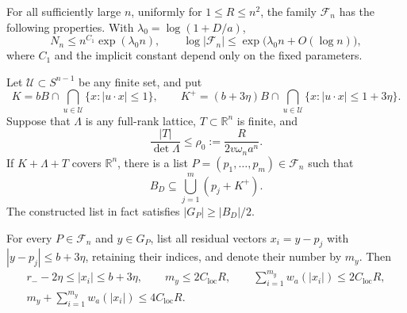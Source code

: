 \begin{proposition}\label{prop:localization}
For all sufficiently large $n$, uniformly for $1\le R\le n^2$, the family
$\mathcal F_n$ has the following properties.  With
$\lambda_0=\log(1+D/a)$,
\begin{equation}\label{eq:pattern-entropy}
 N_n\le n^{C_1}\exp(\lambda_0n),\qquad
 \log|\mathcal F_n|
       \le\exp\bigl(\lambda_0n+O(\log n)\bigr),
\end{equation}
where $C_1$ and the implicit constant depend only on the fixed parameters.

Let $\mathcal U\subset S^{n-1}$ be any finite set, and put
\[
 K=bB\cap\bigcap_{u\in\mathcal U}\{x:|u\cdot x|\le1\},\qquad
 K^+=(b+3\eta)B\cap
          \bigcap_{u\in\mathcal U}\{x:|u\cdot x|\le1+3\eta\}.
\]
Suppose that $\Lambda$ is any full-rank lattice, $T\subset\mathbb R^n$
is finite, and
\[
 \frac{|T|}{\det\Lambda}\le
       \rho_0:=\frac{R}{2v\omega_na^n}.
\]
If $K+\Lambda+T$ covers $\mathbb R^n$, there is a list
$P=(p_1,\ldots,p_m)\in\mathcal F_n$
such that
\begin{equation}\label{eq:localized-cover}
 B_D\subseteq\bigcup_{j=1}^{m}(p_j+K^+).
\end{equation}
The constructed list in fact satisfies $|G_P|\ge|B_D|/2$.

For every $P\in\mathcal F_n$ and $y\in G_P$, list all residual vectors
$x_i=y-p_j$ with $|y-p_j|\le b+3\eta$, retaining their indices, and denote
their number by $m_y$.  Then
\begin{equation}\label{eq:local-residual-budget}
 \begin{gathered}
 r_--2\eta\le |x_i|\le b+3\eta,\qquad
 m_y\le2C_{\mathrm{loc}}R,\qquad
 \sum_{i=1}^{m_y}w_a(|x_i|)\le2C_{\mathrm{loc}}R,\\
 m_y+\sum_{i=1}^{m_y}w_a(|x_i|)\le4C_{\mathrm{loc}}R.
 \end{gathered}
\end{equation}
\end{proposition}

